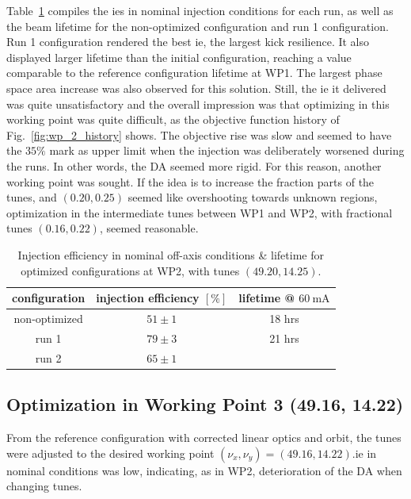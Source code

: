 Table~\ref{tb:wp2summary} compiles the \glspl*{ie} in nominal injection conditions for each run, as well as the beam lifetime for the non-optimized configuration and run 1 configuration. Run 1 configuration rendered the best \gls*{ie}, the largest kick resilience. It also displayed larger lifetime than the initial configuration, reaching a value comparable to the reference configuration lifetime at \gls*{WP1}. The largest phase space area increase was also observed for this solution. Still, the \gls*{ie} it delivered was quite unsatisfactory and the overall impression was that optimizing in this working point was quite difficult, as the objective function history of Fig.~\ref{fig:wp_2_history} shows. The objective rise was slow and seemed to have the $35\%$ mark as upper limit when the injection was deliberately worsened during the runs. In other words, the \gls*{DA} seemed more rigid. For this reason, another working point was sought. If the idea is to increase the fraction parts of the tunes, and $(0.20, 0.25)$ seemed like overshooting towards unknown regions, optimization in the intermediate tunes between \gls*{WP1} and \gls*{WP2}, with fractional tunes $(0.16, 0.22)$, seemed reasonable.
\begin{table}[htb]
    \centering
    \caption{Injection efficiency in nominal off-axis conditions \& lifetime for optimized configurations at WP2, with tunes $(49.20, 14.25)$.}
    \begin{tabular}{ccc}
    \hline
    configuration & injection efficiency $[\%]$ & lifetime @ $\unit{60~\milli\ampere}$ \\ \hline
    non-optimized    & $51\pm1$                 &  18 hrs \\
    run 1            & $79\pm3$                 &  21 hrs  \\
    run 2            & $65\pm1$                 &           \\ \hline
    \end{tabular}
    \label{tb:wp2summary}
    \end{table}
\subsection{Optimization in Working Point 3 (49.16, 14.22)}
From the reference configuration with corrected linear optics and orbit, the tunes were adjusted to the desired working point $(\nu_x, \nu_y)=(49.16, 14.22)$.\gls*{ie} in nominal conditions was low, indicating, as in \gls*{WP2}, deterioration of the \gls*{DA} when changing tunes.

